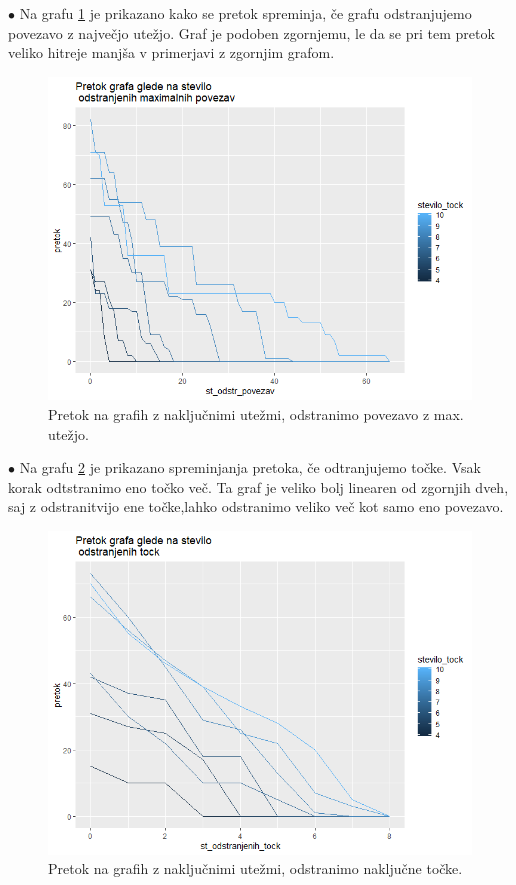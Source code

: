 \documentclass[a4paper]{article}
\begin{document}
$\bullet $ Na grafu \ref{fig4} je prikazano kako se pretok spreminja, če grafu odstranjujemo povezavo z največjo utežjo. Graf je podoben zgornjemu, le da se pri tem pretok veliko hitreje manjša v primerjavi z zgornjim grafom. 
\begin{figure}[h]
\centerline{\includegraphics[scale=.5]{p4.PNG}}
\caption{Pretok na grafih z naključnimi utežmi, odstranimo povezavo z max. utežjo. }
\label{fig4}
\end{figure}

$\bullet $ Na grafu \ref{fig5} je prikazano spreminjanja pretoka, če odtranjujemo točke. Vsak korak odtstranimo eno točko več. Ta graf je veliko bolj linearen od zgornjih dveh, saj z odstranitvijo ene točke,lahko odstranimo veliko več kot samo eno povezavo. 
\begin{figure}[h]
\centerline{\includegraphics[scale=.5]{p5.PNG}}
\caption{Pretok na grafih z naključnimi utežmi, odstranimo naključne točke.}
\label{fig5}
\end{figure}
\end{document}
